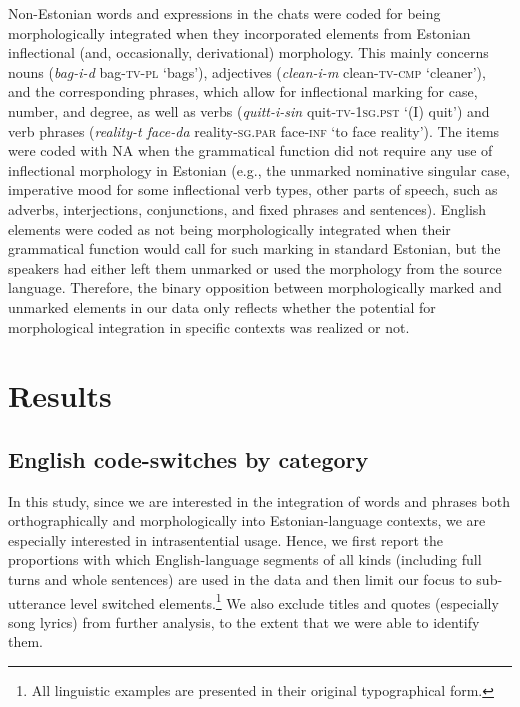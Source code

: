 \documentclass[output=paper]{langscibook}
\begin{document}
Non-Estonian words and expressions in the chats were coded for being morphologically integrated when they incorporated elements from Estonian inflectional (and, occasionally, derivational) morphology. This mainly concerns nouns (\textit{bag-i-d} bag{}-\textsc{tv-pl} ‘bags’), adjectives (\textit{clean-i-m} clean{}-\textsc{tv-cmp} ‘cleaner’), and the corresponding phrases, which allow for inflectional marking for case, number, and degree, as well as verbs (\textit{quitt-i-sin} quit{}-\textsc{tv}{}-1\textsc{sg.pst} ‘(I) quit’) and verb phrases (\textit{reality-t face-da} reality{}-\textsc{sg.par} face{}-\textsc{inf} ‘to face reality’). The items were coded with NA when the grammatical function did not require any use of inflectional morphology in Estonian (e.g., the unmarked nominative singular case, imperative mood for some inflectional verb types, other parts of speech, such as adverbs, interjections, conjunctions, and fixed phrases and sentences). English elements were coded as not being morphologically integrated when their grammatical function would call for such marking in standard Estonian, but the speakers had either left them unmarked or used the morphology from the source language. Therefore, the binary opposition between morphologically marked and unmarked elements in our data only reflects whether the potential for morphological integration in specific contexts was realized or not.


\section{Results}\label{sec:vihmanetal:4}
\subsection{English code-switches by category}\label{sec:vihmanetal:4.1}

In this study, since we are interested in the integration of words and phrases both orthographically and morphologically into Estonian-language contexts, we are especially interested in intrasentential usage. Hence, we first report the proportions with which English-language segments of all kinds (including full turns and whole sentences) are used in the data and then limit our focus to sub-utterance level switched elements.\footnote{All linguistic examples are presented in their original typographical form.} We also exclude titles and quotes (especially song lyrics) from further analysis, to the extent that we were able to identify them.
\end{document}
